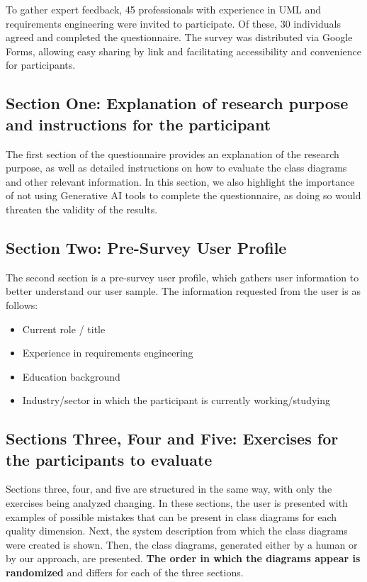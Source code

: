 To gather expert feedback, 45 professionals with experience in UML and requirements engineering were invited to participate. Of these, 30 individuals agreed and completed the questionnaire. The survey was 
distributed via Google Forms, allowing easy sharing by link and facilitating accessibility and convenience for participants.

\subsection{Section One: Explanation of research purpose and instructions for the participant}

The first section of the questionnaire provides an explanation of the research purpose, as well as detailed instructions on how to evaluate the class diagrams and other relevant information. In this section, we also highlight the importance of not using Generative AI tools to complete the questionnaire, as doing so would threaten the validity of the results.

\subsection{Section Two: Pre-Survey User Profile}

The second section is a pre-survey user profile, which gathers user information 
to better understand our user sample. The information requested from the user is as follows:

\begin{itemize}
    \item Current role / title
    \item Experience in requirements engineering
    \item Education background
    \item Industry/sector in which the participant is currently working/studying
\end{itemize}

\subsection{Sections Three, Four and Five: Exercises for the participants to evaluate}

Sections three, four, and five are structured in the same way, with only the exercises 
being analyzed changing. In these sections, the user is presented with examples of 
possible mistakes that can be present in class diagrams for each quality dimension. 
Next, the system description from which the class diagrams were created is shown. 
Then, the class diagrams, generated either by a human or by our approach, are 
presented. \textbf{The order in which the diagrams appear is randomized} and differs 
for each of the three sections.

